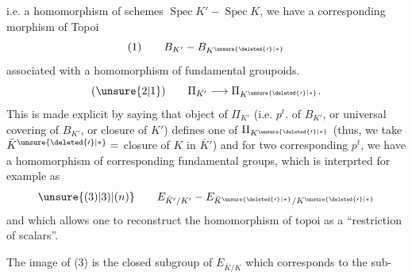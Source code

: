 i.e. a homomorphism of schemes $\operatorname{Spec}K' - \operatorname{Spec}K$, we have a corresponding morphism of Topoi
\[
(1)\qquad B_{K'}-B_{K^{\unsure{\deleted{\prime}|*}}}
\]
associated with a homomorphism of fundamental groupoids.
\[
(\unsure{2|1})\qquad \Pi_{K'}\longrightarrow\Pi_{K^{\unsure{\deleted{\prime}|*}}}.
\]
This is made explicit by saying that   object of $\Pi_{K'}$ (i.e. $p^t$. of $B_{K'}$, or universal covering of $B_{K'}$, \deleted{)} or  closure  of $K'$) defines one of $\Pi_{K^{\unsure{\deleted{\prime}|*}}}$ (thus, we take $\bar K^{\unsure{\deleted{\prime}|*}}=$   closure of $K$ in $\bar K'$) and for two corresponding $p^t$, we have a homomorphism of corresponding fundamental groups, which is interprted for example as
\[
\unsure{(3)|3)|(n)}\qquad E_{\bar K'/K'}-E_{\bar K^{\unsure{\deleted{\prime}|*}}/K^{\unsure{\deleted{\prime}|*}}}
\]
and which allows one to reconstruct the homomorphism of topoi as a ``restriction of scalars''.

The image of (3) is the closed subgroup of $E_{\bar K/K}$ which corresponds to the sub-
